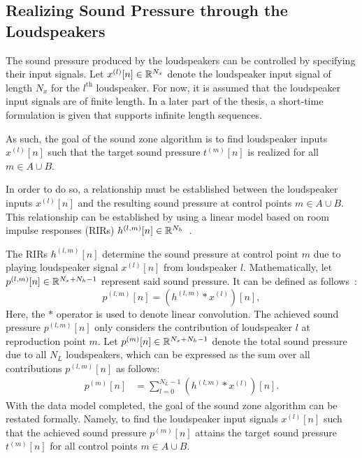 \subsection{Realizing Sound Pressure through the Loudspeakers}
\label{ch:sound_zone:data_model:realizing_pressure}
The sound pressure produced by the loudspeakers can be controlled by specifying their input signals.
Let $x^{(l)}[n]\in\mathbb{R}^{N_x}$ denote the loudspeaker input signal of length $N_x$ for the $l^\text{th}$ loudspeaker.
For now, it is assumed that the loudspeaker input signals are of finite length. 
In a later part of the thesis, a short-time formulation is given that supports infinite length sequences. 

As such, the goal of the sound zone algorithm is to find loudspeaker inputs $x^{(l)}[n]$ 
such that the target sound pressure $t^{(m)}[n]$ is realized for all $m\in A \cup B$.

In order to do so, a relationship must be established between the loudspeaker inputs $x^{(l)}[n]$
and the resulting sound pressure at control points $m\in A \cup B$. 
This relationship can be established by using a linear model based on room impulse responses (RIRs) $h^{(l,m)}[n]\in\mathbb{R}^{N_h}$~\cite{habets2006room}.

The RIRs $h^{(l,m)}[n]$ determine the sound pressure at control point $m$ due to playing loudspeaker signal $x^{(l)}[n]$ from loudspeaker $l$. 
Mathematically, let $p^{(l,m)}[n]\in\mathbb{R}^{N_x + N_h - 1}$ represent said sound pressure. 
It can be defined as follows~\cite{betlehem2015personal}:
\begin{equation}
    p^{(l,m)}[n] = \left(h^{(l,m)} \ast x^{(l)}\right)[n],
\end{equation}
Here, the $\ast$ operator is used to denote linear convolution. 
The achieved sound pressure $p^{(l,m)}[n]$ only considers the contribution of loudspeaker $l$ at reproduction point $m$.
Let $p^{(m)}[n]\in\mathbb{R}^{N_x + N_h - 1}$ denote the total sound pressure due to all $N_L$ loudspeakers,
which can be expressed as the sum over all contributions $p^{(l,m)}[n]$ as follows: 
\begin{align}
    p^{(m)}[n] &= \sum_{l=0}^{N_L - 1} \left(h^{(l,m)} \ast x^{(l)}\right)[n].\label{eq:sound_zone:data_model:achieved_pressure}
\end{align}
With the data model completed, the goal of the sound zone algorithm can be restated formally.
Namely, to find the loudspeaker input signals $x^{(l)}[n]$ such that the achieved sound pressure $p^{(m)}[n]$ attains the
target sound pressure $t^{(m)}[n]$ for all control points $m\in A \cup B$.

